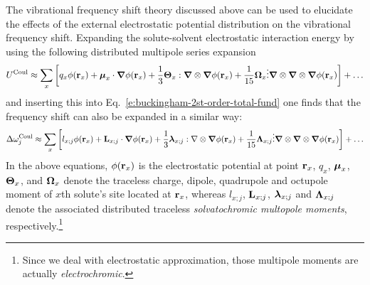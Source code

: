 \documentclass[a4paper,titlepage,twoside,fleqn,12pt]{book}
\newcommand{\BM}[1]{\ensuremath{\mbox{\boldmath${#1}$}}}
\begin{document}
\begin{refsection}
The vibrational frequency shift theory discussed above 
can be used
to elucidate the effects of the external electrostatic 
potential distribution on the vibrational frequency shift.
Expanding the solute-solvent electrostatic interaction energy by using the
following distributed multipole series 
expansion\citep{Stone.TheTheoryOfIntermolecularForces.1996}
%
\begin{equation} \label{e:dmtp}
 U^{\rm Coul} \approx  \sum_x \left[ q_x \phi({\bf r}_x) + 
                  {\BM \mu}_x \cdot {\BM \nabla} \phi({\bf r}_x)   + 
      \frac{1}{3} {\BM \Theta}_x : {\BM \nabla} \otimes {\BM \nabla} \phi({\bf r}_x)   + 
     \frac{1}{15} {\BM \Omega}_x \vdots {\BM \nabla} \otimes {\BM \nabla} \otimes {\BM \nabla} \phi({\bf r}_x) \right] + \ldots
\end{equation}
%
and inserting this into Eq.~\eqref{e:buckingham-2st-order-total-fund} 
one finds that the frequency shift can also be expanded
in a similar way\citep{Cho.JCP.2009}:
%
\begin{equation} \label{e:dmtp-sol}
 \Delta\omega_j^{\rm Coul} \approx  \sum_x \left[ l_{x;j} \phi({\bf r}_x) + 
                        {\bf L}_{x;j} \cdot {\BM \nabla} \phi({\bf r}_x)   + 
      \frac{1}{3} {\BM \lambda}_{x;j} : {\bf \nabla} \otimes {\BM \nabla} \phi({\bf r}_x)   + 
     \frac{1}{15} {\BM \Lambda}_{x;j} \vdots {\BM \nabla} \otimes {\BM \nabla} \otimes {\BM \nabla} \phi({\bf r}_x) \right] + \ldots
\end{equation}
%
In the above equations, $\phi({\bf r}_x)$ is the electrostatic
potential at point ${\bf r}_x$,
$q_x$, ${\BM \mu}_x$, ${\BM \Theta}_x$, and ${\BM \Omega}_x$ 
denote the traceless charge, dipole, quadrupole and octupole moment 
of $x$th solute's site located at ${\bf r}_x$, whereas 
$l_{x;j}$, ${\bf L}_{x;j}$, ${\BM \lambda}_{x;j}$ and ${\BM \Lambda}_{x;j}$ 
denote the associated distributed traceless
\emph{solvatochromic multopole moments}, respectively.\footnote{Since we deal with 
electrostatic approximation, those multipole moments are actually \emph{electrochromic}.}


\end{refsection}
\end{document}
